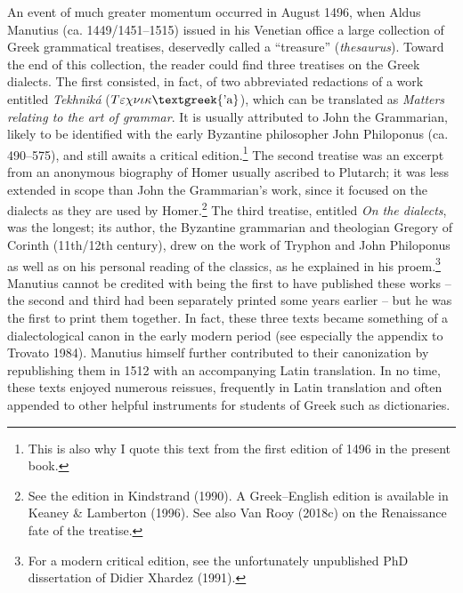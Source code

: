 \begin{styleStandard}
An event of much greater momentum occurred in August 1496, when Aldus Manutius (ca. 1449/1451–1515) issued in his Venetian office a large collection of Greek grammatical treatises, deservedly called a “treasure” (\textit{thesaurus}). Toward the end of this collection, the reader could find three treatises on the Greek dialects. The first consisted, in fact, of two abbreviated redactions of a work entitled \textit{Tekhniká} ($T\varepsilon \chi \nu \iota \kappa \text{\textgreek{'a}}$), which can be translated as \textit{Matters relating to the art of grammar}. It is usually attributed to John the Grammarian, likely to be identified with the early Byzantine philosopher John Philoponus (ca. 490–575), and still awaits a critical edition.\footnote{ This is also why I quote this text from the first edition of 1496 in the present book.} The second treatise was an excerpt from an anonymous biography of Homer usually ascribed to Plutarch; it was less extended in scope than John the Grammarian’s work, since it focused on the dialects as they are used by Homer.\footnote{ See the edition in Kindstrand (1990). A Greek–English edition is available in Keaney \& Lamberton (1996). See also Van Rooy (2018c) on the Renaissance fate of the treatise.} The third treatise, entitled \textit{On the dialects}, was the longest; its author, the Byzantine grammarian and theologian Gregory of Corinth (11th/12th century), drew on the work of Tryphon and John Philoponus as well as on his personal reading of the classics, as he explained in his proem.\footnote{ For a modern critical edition, see the unfortunately unpublished PhD dissertation of Didier Xhardez (1991).} Manutius cannot be credited with being the first to have published these works – the second and third had been separately printed some years earlier – but he was the first to print them together. In fact, these three texts became something of a dialectological canon in the early modern period (see especially the appendix to Trovato 1984). Manutius himself further contributed to their canonization by republishing them in 1512 with an accompanying Latin translation. In no time, these texts enjoyed numerous reissues, frequently in Latin translation and often appended to other helpful instruments for students of Greek such as dictionaries.
\end{styleStandard}

